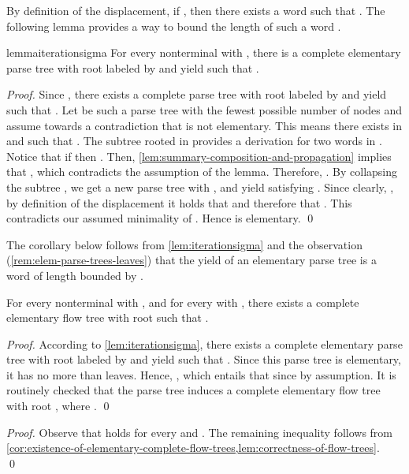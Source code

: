 By definition of the displacement,
if ,
then there exists a word 
such that .
The following lemma provides a way to bound the length of such a word .

\begin{restatable}{lemma}{iterationsigma}
  \label{lem:iterationsigma}
  For every nonterminal  with ,
  there is a complete
  elementary parse tree with root labeled by  and
  yield  such that .
\end{restatable}
\begin{proof}
  Since ,
  there exists a complete parse tree with root labeled by  and yield
   such that .
  Let  be such a parse tree with the fewest possible number
  of nodes and assume towards a contradiction that  is not elementary. 
  This means there exists  in  and  such
  that .
  The subtree rooted in  provides a derivation 
  for two words  in .
Notice that if  then
  .
  Then, \cref{lem:summary-composition-and-propagation} implies that
  ,
  which contradicts the assumption of the lemma. Therefore, . 
  By collapsing the subtree
  ,
  we get a new parse
  tree  with ,  and
  yield  satisfying
  .
  Since clearly, , by definition of the displacement
  it holds that  and therefore that .
  This contradicts our assumed minimality of .
  Hence  is elementary.
  \qed
\end{proof}

The corollary below follows from \cref{lem:iterationsigma}
and the observation (\cref{rem:elem-parse-trees-leaves})
that the yield of an elementary parse tree is a word of length bounded by
.

\begin{corollary}
  \label{cor:existence-of-elementary-complete-flow-trees}
  For every nonterminal  with ,
  and for every  with ,
  there exists a complete elementary flow tree with root
   such that
  .
\end{corollary}
\begin{proof}
  According to \cref{lem:iterationsigma},
  there exists a complete elementary parse tree 
  with root labeled by  and
  yield  such that .
  Since this parse tree is elementary,
  it has no more than  leaves.
Hence, ,
  which entails that
   since  by assumption.
  It is routinely checked that
  the parse tree  induces
  a complete elementary flow tree with root ,
  where .
  \qed
\end{proof}



\existselementaryparsetree*
\begin{proof}
  Observe that  holds
  for every  and .
  The remaining inequality follows from
  \cref{cor:existence-of-elementary-complete-flow-trees,lem:correctness-of-flow-trees}.
\qed
\end{proof}








